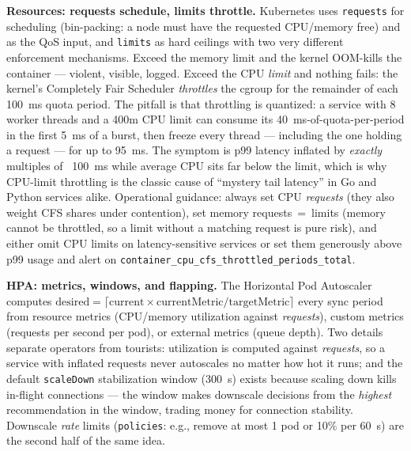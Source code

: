 \textbf{Resources: requests schedule, limits throttle.} Kubernetes uses
\texttt{requests} for scheduling (bin-packing: a node must have the
requested CPU/memory free) and as the QoS input, and \texttt{limits} as
hard ceilings with two very different enforcement mechanisms. Exceed the
memory limit and the kernel OOM-kills the container --- violent, visible,
logged. Exceed the CPU \emph{limit} and nothing fails: the kernel's
Completely Fair Scheduler \emph{throttles} the cgroup for the remainder
of each 100~ms quota period. The pitfall is that throttling is quantized:
a service with 8 worker threads and a 400m CPU limit can consume its
40~ms-of-quota-per-period in the first 5~ms of a burst, then freeze every
thread --- including the one holding a request --- for up to 95~ms. The
symptom is p99 latency inflated by \emph{exactly} multiples of ~100~ms
while average CPU sits far below the limit, which is why CPU-limit
throttling is the classic cause of ``mystery tail latency'' in Go and
Python services alike. Operational guidance: always set CPU
\emph{requests} (they also weight CFS shares under contention), set
memory requests~=~limits (memory cannot be throttled, so a limit without
a matching request is pure risk), and either omit CPU limits on
latency-sensitive services or set them generously above p99 usage and
alert on \texttt{container\_cpu\_cfs\_throttled\_periods\_total}.

\textbf{HPA: metrics, windows, and flapping.} The Horizontal Pod
Autoscaler computes $\text{desired} = \lceil \text{current} \times
\text{currentMetric} / \text{targetMetric} \rceil$ every sync period from
resource metrics (CPU/memory utilization against \emph{requests}),
custom metrics (requests per second per pod), or external metrics
(queue depth). Two details separate operators from tourists: utilization
is computed against \emph{requests}, so a service with inflated requests
never autoscales no matter how hot it runs; and the default
\texttt{scaleDown} stabilization window (300~s) exists because scaling
down kills in-flight connections --- the window makes downscale
decisions from the \emph{highest} recommendation in the window, trading
money for connection stability. Downscale \emph{rate} limits
(\texttt{policies}: e.g., remove at most 1 pod or 10\% per 60~s) are the
second half of the same idea.

